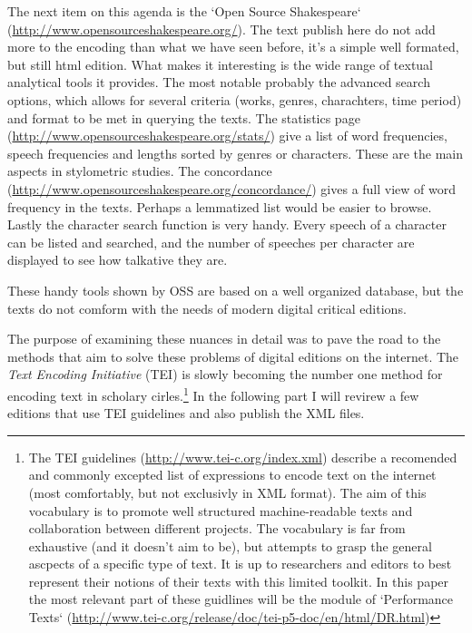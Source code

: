 The next item on this agenda is the `Open Source Shakespeare` (\url{http://www.opensourceshakespeare.org/}). The text publish here do not add more to the encoding than what we have seen before, it's a simple well formated, but still html edition. What makes it interesting is the wide range of textual analytical tools it provides. The most notable probably the advanced search options, which allows for several criteria (works, genres, charachters, time period) and format to be met in querying the texts. The statistics page (\url{http://www.opensourceshakespeare.org/stats/}) give a list of word frequencies, speech frequencies and lengths sorted by genres or characters. These are the main aspects in stylometric studies. The concordance (\url{http://www.opensourceshakespeare.org/concordance/}) gives a full view of word frequency in the texts. Perhaps a lemmatized list would be easier to browse. Lastly the character search function is very handy. Every speech of a character can be listed and searched, and the number of speeches per character are displayed to see how talkative they are.

These handy tools shown by OSS are based on a well organized database, but the texts do not comform with the needs of modern digital critical editions.

The purpose of examining these nuances in detail was to pave the road to the methods that aim to solve these problems of digital editions on the internet. The \textit{Text Encoding Initiative} (TEI) is slowly becoming the number one method for encoding text in scholary cirles.\footnote{The TEI guidelines (\url{http://www.tei-c.org/index.xml}) describe a recomended and commonly excepted list of expressions to encode text on the internet (most comfortably, but not exclusivly in XML format). The aim of this vocabulary is to promote well structured machine-readable texts and collaboration between different projects. The vocabulary is far from exhaustive (and it doesn't aim to be), but attempts to grasp the general ascpects of a specific type of text. It is up to researchers and editors to best represent their notions of their texts with this limited toolkit. In this paper the most relevant part of these guidlines will be the module of `Performance Texts` (\url{http://www.tei-c.org/release/doc/tei-p5-doc/en/html/DR.html})} In the following part I will revirew a few editions that use TEI guidelines and also publish the XML files.

 